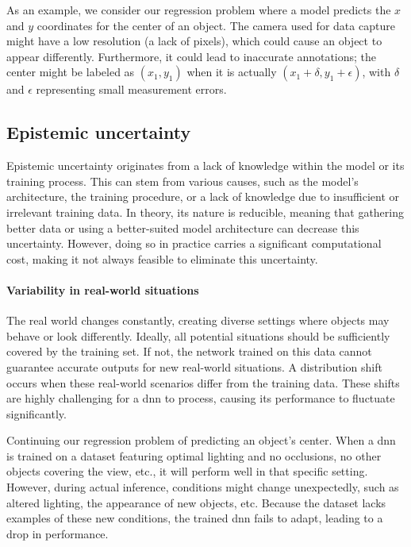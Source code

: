 As an example, we consider our regression problem where a model predicts the $x$ and $y$ coordinates for the center of an object.
The camera used for data capture might have a low resolution (a lack of pixels), which could cause an object to appear differently.
Furthermore, it could lead to inaccurate annotations; the center might be labeled as $(x_1, y_1)$ when it is actually $(x_1+\delta, y_1+\epsilon)$, with $\delta$ and $\epsilon$ representing small measurement errors.

\subsection{Epistemic uncertainty}\label{ch:literature-study_section:uncertainty-in-ai_subsection:epistemic-uncertainty}
Epistemic uncertainty originates from a lack of knowledge within the model or its training process.
This can stem from various causes, such as the model's architecture, the training procedure, or a lack of knowledge due to insufficient or irrelevant training data.
In theory, its nature is reducible, meaning that gathering better data or using a better-suited model architecture can decrease this uncertainty.
However, doing so in practice carries a significant computational cost, making it not always feasible to eliminate this uncertainty.

\paragraph{Variability in real-world situations} \label{ch:literature-study_section:uncertainty-in-ai_subsection:epistemic-uncertainty_paragraph:variability-in-real-world-situations}
The real world changes constantly, creating diverse settings where objects may behave or look differently.
Ideally, all potential situations should be sufficiently covered by the training set.
If not, the network trained on this data cannot guarantee accurate outputs for new real-world situations.
A distribution shift occurs when these real-world scenarios differ from the training data.
These shifts are highly challenging for a \gls{dnn} to process, causing its performance to fluctuate significantly.

Continuing our regression problem of predicting an object's center.
When a \gls{dnn} is trained on a dataset featuring optimal lighting and no occlusions, no other objects covering the view, etc., it will perform well in that specific setting.
However, during actual inference, conditions might change unexpectedly, such as altered lighting, the appearance of new objects, etc.
Because the dataset lacks examples of these new conditions, the trained \gls{dnn} fails to adapt, leading to a drop in performance.

